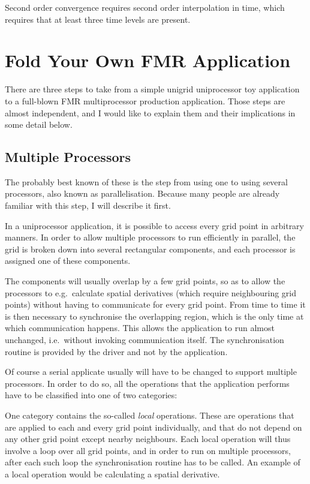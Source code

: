 Second order convergence requires second order interpolation in time,
which requires that at least three time levels are present.



\section{Fold Your Own FMR Application}

There are three steps to take from a simple unigrid uniprocessor toy
application to a full-blown FMR multiprocessor production application.
Those steps are almost independent, and I would like to explain them
and their implications in some detail below.

\subsection{Multiple Processors}

The probably best known of these is the step from using one to using
several processors, also known as parallelisation.  Because many
people are already familiar with this step, I will describe it first.

In a uniprocessor application, it is possible to access every grid
point in arbitrary manners.  In order to allow multiple processors to
run efficiently in parallel, the grid is broken down into several
rectangular components, and each processor is assigned one of these
components.

The components will usually overlap by a few grid points, so as to
allow the processors to e.g.\ calculate spatial derivatives (which
require neighbouring grid points) without having to communicate for
every grid point.  From time to time it is then necessary to
synchronise the overlapping region, which is the only time at which
communication happens.  This allows the application to run almost
unchanged, i.e.\ without invoking communication itself.  The
synchronisation routine is provided by the driver and not by the
application.

Of course a serial applicate usually will have to be changed to
support multiple processors.  In order to do so, all the operations
that the application performs have to be classified into one of two
categories:

One category contains the so-called \emph{local} operations.  These
are operations that are applied to each and every grid point
individually, and that do not depend on any other grid point except
nearby neighbours.  Each local operation will thus involve a loop over
all grid points, and in order to run on multiple processors, after
each such loop the synchronisation routine has to be called.  An
example of a local operation would be calculating a spatial
derivative.

